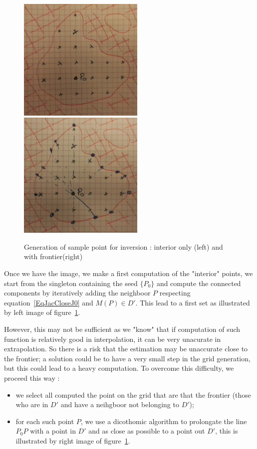 \begin{figure}
\centering
\includegraphics[width=6cm]{Programmer/ImagesProg/PointInver-Interior.jpg}
\includegraphics[width=6cm]{Programmer/ImagesProg/PointInver-WFront.jpg}
\caption{Generation of sample point for inversion : interior only (left) and with frontier(right)}
\label{fig:PointInvGen}
\end{figure}


Once we have the image, we make a first computation of the "interior" points,
we start from the singleton containing the seed $\{P_0\}$ and compute the connected 
components by iteratively adding the neighboor $P$ respecting equation~\ref{EqJacCloseJ0}
and  $M(P) \in D'$.  This lead to a first set as illustrated by left image 
of figure~\ref{fig:PointInvGen}.

However, this may not be sufficient as we "know" that if computation of such function
is relatively good in interpolation, it can be very unacurate in extrapolation. So there
is a risk that the estimation may be unaccurate close to the frontier; a solution
could be to have a very small step in the grid generation, but this could lead to
a heavy computation.  To overcome this difficulty, we proceed this way :

\begin{itemize}
    \item we select all computed the point on the grid that are that the frontier
          (those who are in $D'$ and  have a neihgboor not belonging to $D'$);

    \item  for each such point $P$,  we use a dicothomic algorithm to prolongate the
	   line $P_0P$ with a point in $D'$ and as close as possible to a point out $D'$,
           this is illustrated by right image of figure~\ref{fig:PointInvGen}.
\end{itemize}


